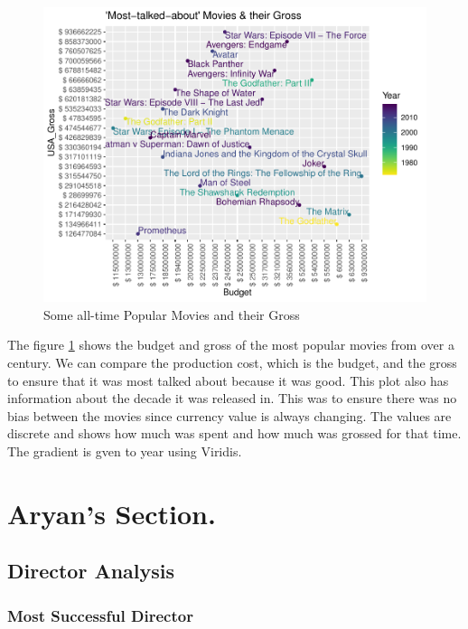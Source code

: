 \documentclass[11pt,a4paper,]{article}
\begin{document}
\begin{figure}[H]

{\centering \includegraphics{Report_files/figure-latex/AllGrossPlot-1} 

}

\caption{Some all-time Popular Movies and their Gross}\label{fig:AllGrossPlot}
\end{figure}

The figure \ref{fig:AllGrossPlot} shows the budget and gross of the most popular movies from over a century. We can compare the production cost, which is the budget, and the gross to ensure that it was most talked about because it was good. This plot also has information about the decade it was released in. This was to ensure there was no bias between the movies since currency value is always changing. The values are discrete and shows how much was spent and how much was grossed for that time. The gradient is gven to year using Viridis.

\hypertarget{aryans-section.}{%
\section{Aryan's Section.}\label{aryans-section.}}

\hypertarget{director-analysis}{%
\subsection{Director Analysis}\label{director-analysis}}

\hypertarget{most-successful-director}{%
\subsubsection{Most Successful Director}\label{most-successful-director}}
\end{document}
